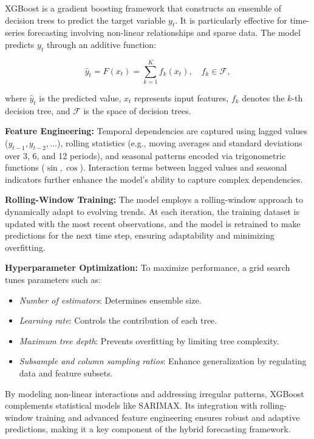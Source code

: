 \documentclass[journal]{IEEEtran}
\begin{document}
XGBoost is a gradient boosting framework that constructs an ensemble of decision trees to predict the target variable \(y_t\). It is particularly effective for time-series forecasting involving non-linear relationships and sparse data. The model predicts \(y_t\) through an additive function:

\begin{equation}
\hat{y}_{t} = F(x_{t}) = \sum_{k=1}^{K} f_{k}(x_{t}), \quad f_{k} \in \mathcal{F},
\end{equation}

where \(\hat{y}_{t}\) is the predicted value, \(x_{t}\) represents input features, \(f_{k}\) denotes the \(k\)-th decision tree, and \(\mathcal{F}\) is the space of decision trees.

\textbf{Feature Engineering:} Temporal dependencies are captured using lagged values (\(y_{t-1}, y_{t-2}, \dots\)), rolling statistics (e.g., moving averages and standard deviations over 3, 6, and 12 periods), and seasonal patterns encoded via trigonometric functions (\(\sin, \cos\)). Interaction terms between lagged values and seasonal indicators further enhance the model's ability to capture complex dependencies.

\textbf{Rolling-Window Training:} The model employs a rolling-window approach to dynamically adapt to evolving trends. At each iteration, the training dataset is updated with the most recent observations, and the model is retrained to make predictions for the next time step, ensuring adaptability and minimizing overfitting.

\textbf{Hyperparameter Optimization:} To maximize performance, a grid search tunes parameters such as:
\begin{itemize}
    \item \textit{Number of estimators}: Determines ensemble size.
    \item \textit{Learning rate}: Controls the contribution of each tree.
    \item \textit{Maximum tree depth}: Prevents overfitting by limiting tree complexity.
    \item \textit{Subsample and column sampling ratios}: Enhance generalization by regulating data and feature subsets.
\end{itemize}

By modeling non-linear interactions and addressing irregular patterns, XGBoost complements statistical models like SARIMAX. Its integration with rolling-window training and advanced feature engineering ensures robust and adaptive predictions, making it a key component of the hybrid forecasting framework.
\end{document}
